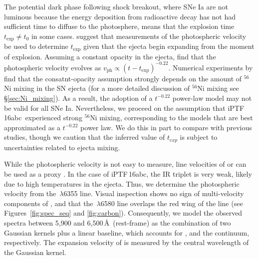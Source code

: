 \documentclass[twocolumn]{aastex61}
\newcommand{\abc}{iPTF\,16abc}
\begin{document}
The potential dark phase following shock breakout, where SNe Ia are not luminous because the energy deposition from radioactive decay has not had sufficient time to diffuse to the photosphere, means that the explosion time $t_\mathrm{exp} \ne t_0$ in some cases. \citet{2014ApJ...784...85P} suggest that measurements of the photospheric velocity be used to determine $t_\mathrm{exp}$ given that the ejecta begin expanding from the moment of explosion.  Assuming a constant opacity in the ejecta, \citeauthor{2014ApJ...784...85P} 
find that the photospheric velocity evolves as
$v_\mathrm{ph}\propto(t-t_\mathrm{exp})^{-0.22}$. Numerical experiments by \citet{2016ApJ...826...96P} find that the consatnt-opacity assumption strongly depends on the amount of $^{56}$Ni mixing in the SN ejecta (for a more detailed discussion of $^{56}$Ni mixing see \S\ref{sec:Ni_mixing}). As a result, the adoption of a $t^{-0.22}$ power-law model may not be valid for all SNe Ia. Nevertheless, we proceed on the assumption that \abc\ experienced strong $^{56}$Ni mixing, corresponding to the models that are best approximated as a $t^{-0.22}$ power law. We do this in part to compare with previous studies, though we caution that the inferred value of $t_{exp}$ is subject to uncertainties related to ejecta mixing. 

While the photospheric velocity
is not easy to measure, line velocities of  or 
can be used as a proxy
\citep{2014ApJ...784...85P,2016ApJ...826..144S}. In the case of \abc, the  IR triplet is very weak, 
likely due to high temperatures in the ejecta. Thus, we
determine the photospheric velocity from the 
\,$\lambda$6355 line. Visual inspection shows no 
sign of multi-velocity components of , and that 
the \,$\lambda$6580 line overlaps the red
wing of the  line (see Figures~\ref{fig:spec_seq} and \ref{fig:carbon}). Consequently, we model the observed 
spectra between 5,900 and 6,500\,\AA\ (rest-frame) as the combination 
of two Gaussian kernels plus a linear baseline, which
accounts for ,  and the
continuum, respectively. The expansion
velocity of  is measured by the central wavelength
of the  Gaussian kernel.
\end{document}

